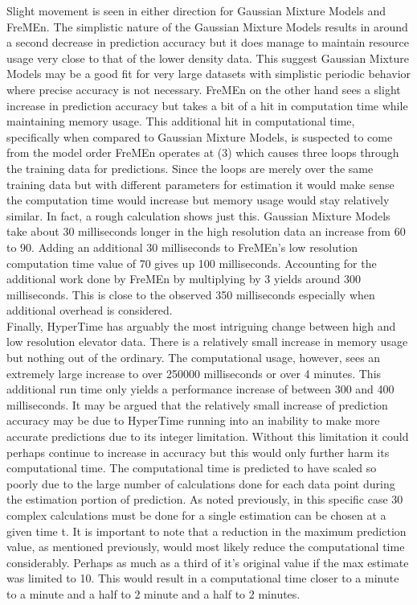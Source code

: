 Slight movement is seen in either direction for Gaussian Mixture Models and
FreMEn. The simplistic nature of the Gaussian Mixture Models results in around
a second decrease in prediction accuracy but it does manage to maintain resource
usage very close to that of the lower density data. This suggest Gaussian
Mixture Models may be a good fit for very large datasets with simplistic
periodic behavior where precise accuracy is not necessary. FreMEn on the other
hand sees a slight increase in prediction accuracy but takes a bit of a hit
in computation time while maintaining memory usage. This additional hit in
computational time, specifically when compared to Gaussian Mixture Models,
is suspected to come from the model order FreMEn operates at (3) which causes
three loops through the training data for predictions. Since the loops are
merely over the same training data but with different parameters for estimation
it would make sense the computation time would increase but memory usage would
stay relatively similar. In fact, a rough calculation shows just this. Gaussian
Mixture Models take about 30 milliseconds longer in the high resolution data
an increase from 60 to 90. Adding an additional 30 milliseconds to FreMEn's
low resolution computation time value of 70 gives up 100 milliseconds. Accounting
for the additional work done by FreMEn by multiplying by 3 yields around 300
milliseconds. This is close to the observed 350 milliseconds especially when
additional overhead is considered. \\

Finally, HyperTime has arguably the most intriguing change between high and low
resolution elevator data. There is a relatively small increase in memory usage
but nothing out of the ordinary. The computational usage, however, sees an
extremely large increase to over 250000 milliseconds or over 4 minutes. This
additional run time only yields a performance increase of between 300 and 400
milliseconds. It may be argued that the relatively small increase of prediction
accuracy may be due to HyperTime running into an inability to make more accurate
predictions due to its integer limitation. Without this limitation it could
perhaps continue to increase in accuracy but this would only further harm its
computational time. The computational time is predicted to have scaled so poorly
due to the large number of calculations done for each data point during the
estimation portion of prediction. As noted previously, in this specific case
30 complex calculations must be done for a single estimation can be chosen at
a given time t. It is important to note that a reduction in the maximum
prediction value, as mentioned previously, would most likely reduce the
computational time considerably. Perhaps as much as a third of it's original
value if the max estimate was limited to 10. This would result in a
computational time closer to a minute to a minute and a half to 2 minute and a
half to 2 minutes.




